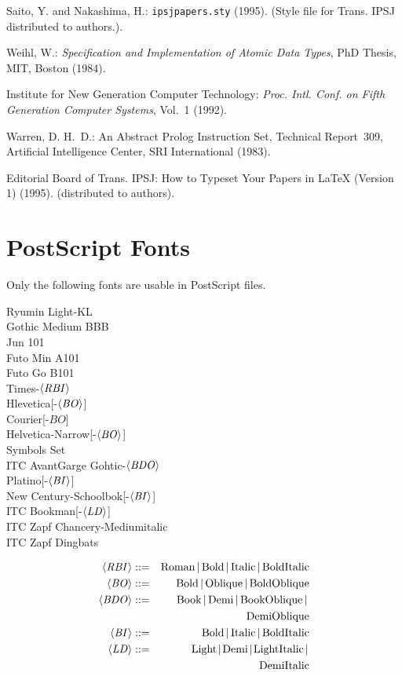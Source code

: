 \begin{thebibliography}{10}
Saito, Y. and Nakashima, H.: {{\tt ipsjpapers.\allowbreak sty}} (1995).
\newblock (Style file for Trans. IPSJ distributed to authors.).

Weihl, W.: {\em Specification and Implementation of Atomic Data Types\/}, PhD
  Thesis, MIT, Boston (1984).

Institute for New Generation Computer Technology: {\em Proc. Intl. Conf. on
  Fifth Generation Computer Systems\/}, Vol.~1 (1992).

Warren, D. H.~D.: An Abstract {Prolog} Instruction Set, Technical Report\ 309,
  Artificial Intelligence Center, SRI International (1983).

{Editorial Board of Trans. IPSJ}: How to Typeset Your Papers in {\LaTeX}
  (Version 1) (1995).
\newblock (distributed to authors).

\end{thebibliography}


\appendix
\section{PostScript Fonts}

\def\RBI{\it\langle RBI\rangle}
\def\BO{\it\langle BO\rangle}
\def\BDO{\it\langle BDO\rangle}
\def\BI{\it\langle BI\rangle}
\def\LD{\it\langle LD\rangle}

Only the following fonts are usable in PostScript files.
%
\begin{Quote}
Ryumin Light-KL\\
Gothic Medium BBB\\
Jun 101\\
Futo Min A101\\
Futo Go B101\\
Times-\(\RBI\)\\
Hlevetica[-\(\BO\)]\\
Courier[-\(BO\)]\\
Helvetica-Narrow[-\(\BO\)]\\
Symbols Set\\
ITC AvantGarge Gohtic-\(\BDO\)\\
Platino[-\(\BI\)]\\
New Century-Schoolbok[-\(\BI\)]\\
ITC Bookman[-\(\LD\)]\\
ITC Zapf Chancery-Mediumitalic\\
ITC Zapf Dingbats
\end{Quote}
{\def\!{$\,|\,$}
\begin{eqnarray*}[s]
\RBI&::=&\hbox{Roman\!Bold\!Italic\!BoldItalic}\\
\BO&::=&\hbox{Bold\!Oblique\!BoldOblique}\\
\BDO&::=&\hbox{Book\!Demi\!BookOblique\!}\\&&\hbox{DemiOblique}\\
\BI&::=&\hbox{Bold\!Italic\!BoldItalic}\\
\LD&::=&\hbox{\thinmuskip.7\thinmuskip Light\!Demi\!LightItalic\!}\\*
	&&\hbox{DemiItalic}
\end{eqnarray*}}

